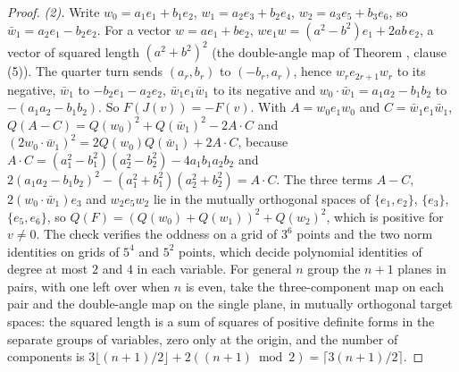 \begin{proof}
\emph{(2).} Write $w_{0} = a_{1}e_{1} + b_{1}e_{2}$, $w_{1} = a_{2}e_{3} + b_{2}e_{4}$, $w_{2} = a_{3}e_{5} + b_{3}e_{6}$, so $\bar w_{1} = a_{2}e_{1} - b_{2}e_{2}$. For a vector $w = ae_{1} + be_{2}$, $w e_{1} w = (a^{2} - b^{2})e_{1} + 2ab\,e_{2}$, a vector of squared length $(a^{2} + b^{2})^{2}$ (the double-angle map of Theorem , clause (5)). The quarter turn sends $(a_{r}, b_{r})$ to $(-b_{r}, a_{r})$, hence $w_{r}e_{2r+1}w_{r}$ to its negative, $\bar w_{1}$ to $-b_{2}e_{1} - a_{2}e_{2}$, $\bar w_{1} e_{1} \bar w_{1}$ to its negative and $w_{0}\cdot \bar w_{1} = a_{1}a_{2} - b_{1}b_{2}$ to $-(a_{1}a_{2} - b_{1}b_{2})$. So $F(J(v)) = -F(v)$. With $A = w_{0}e_{1}w_{0}$ and $C = \bar w_{1}e_{1}\bar w_{1}$, $Q(A - C) = Q(w_{0})^{2} + Q(\bar w_{1})^{2} - 2A\cdot C$ and $(2w_{0}\cdot \bar w_{1})^{2} = 2Q(w_{0})Q(\bar w_{1}) + 2A\cdot C$, because $A\cdot C = (a_{1}^{2} - b_{1}^{2})(a_{2}^{2} - b_{2}^{2}) - 4a_{1}b_{1}a_{2}b_{2}$ and $2(a_{1}a_{2} - b_{1}b_{2})^{2} - (a_{1}^{2} + b_{1}^{2})(a_{2}^{2} + b_{2}^{2}) = A\cdot C$. The three terms $A - C$, $2(w_{0}\cdot \bar w_{1})e_{3}$ and $w_{2}e_{5}w_{2}$ lie in the mutually orthogonal spaces of $\{e_{1}, e_{2}\}$, $\{e_{3}\}$, $\{e_{5}, e_{6}\}$, so $Q(F) = (Q(w_{0}) + Q(w_{1}))^{2} + Q(w_{2})^{2}$, which is positive for $v \neq 0$. The check verifies the oddness on a grid of $3^{6}$ points and the two norm identities on grids of $5^{4}$ and $5^{2}$ points, which decide polynomial identities of degree at most $2$ and $4$ in each variable. For general $n$ group the $n + 1$ planes in pairs, with one left over when $n$ is even, take the three-component map on each pair and the double-angle map on the single plane, in mutually orthogonal target spaces: the squared length is a sum of squares of positive definite forms in the separate groups of variables, zero only at the origin, and the number of components is $3\lfloor (n+1)/2 \rfloor + 2((n+1) \bmod 2) = \lceil 3(n+1)/2 \rceil$.


\end{proof}
